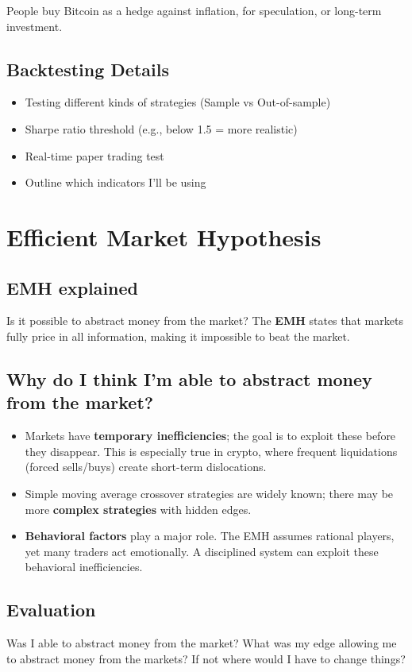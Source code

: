 \documentclass[9pt,a4paper,twocolumn,twoside]{tau-class/tau}
\begin{document}
People buy Bitcoin as a hedge against inflation, for speculation, or long-term investment. 




\subsection{Backtesting Details}
\begin{itemize}
  \item Testing different kinds of strategies (Sample vs Out-of-sample)
  \item Sharpe ratio threshold (e.g., below 1.5 = more realistic)
  \item Real-time paper trading test
  \item Outline which indicators I’ll be using
\end{itemize}

\section{Efficient Market Hypothesis}
\subsection{EMH explained}
Is it possible to abstract money from the market? The \textbf{EMH} states that markets fully price in all information, making it impossible to beat the market.

\subsection{Why do I think I'm able to abstract money from the market?}
\begin{itemize}
  \item Markets have \textbf{temporary inefficiencies}; the goal is to exploit these before they disappear. This is especially true in crypto, where frequent liquidations (forced sells/buys) create short-term dislocations.
  \item Simple moving average crossover strategies are widely known; there may be more \textbf{complex strategies} with hidden edges.
  \item \textbf{Behavioral factors} play a major role. The EMH assumes rational players, yet many traders act emotionally. A disciplined system can exploit these behavioral inefficiencies.
\end{itemize}


\subsection{Evaluation}
Was I able to abstract money from the market? What was my edge allowing me to abstract money from the markets? If not where would I have to change things? 



\end{document}
